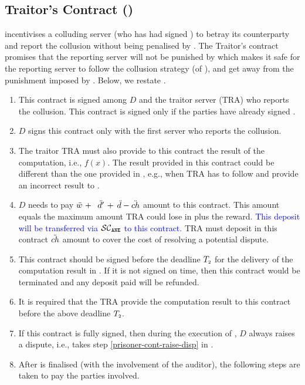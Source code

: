 
\vs
\subsection{Traitor's Contract (\SCtc)}

\SCtc incentivises a colluding server (who has had signed \SCcc) to betray its counterparty and report the collusion without being penalised by \SCpc.  The Traitor’s contract promises that the reporting server will not be
punished by \SCpc which makes it safe for the reporting server to follow the collusion strategy (of \SCcc), and get away from the punishment imposed by \SCpc. Below, we restate \SCtc. 


\begin{enumerate}
%
\item This contract is signed among $ { D}$ and the traitor server (TRA) who reports the collusion. This contract is signed only if the parties have already signed \SCpc. 
%
\item  $ { D}$ signs this contract only with the first server who reports the collusion. 
%
\item The traitor TRA must also provide to this contract the result of the computation, i.e., $f(x)$. The result provided in this contract could be different than the one provided in \SCpc, e.g., when TRA has to follow \SCcc and provide an incorrect result to \SCpc. 
%
\item  $  D$ needs to pay  $\ddot{w} \ +\ $\textcolor{blue}{ $\ddot{d}' \ + $} $\ddot{d}-\ddot{ch}$ amount to this contract. This amount equals the maximum amount TRA could lose in \SCpc plus the reward. \textcolor{blue}{This deposit will be transferred via $\mathcal{SC}_{\mathtt{ANE}}$ to this contract.}  TRA must deposit in this contract $\ddot{ch}$ amount to cover the cost of resolving a potential dispute.  
%
\item  This contract should be signed before the deadline  $T_{\scriptscriptstyle 2}$  for the delivery of the computation result in \SCpc. If it is not signed on time, then this contract would be terminated and any deposit paid will be refunded.
%
\item It is required that the TRA provide the computation result to this contract before the above deadline $T_{\scriptscriptstyle 2}$.
%
\item If this contract is fully signed, then during the execution of \SCpc, $ { D}$ always raises a dispute, i.e., takes step \ref{prisoner-cont-raise-disp} in \SCpc.
%
\item After \SCpc is finalised (with the involvement of the auditor), the following steps are taken to pay the parties involved.   

\end{enumerate}
